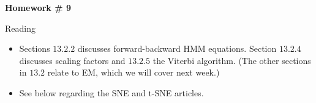 \documentclass{article}
\begin{document}
\renewcommand{\a}{\textbf{a}}
\renewcommand{\b}{\textbf{b}}
\renewcommand{\d}{\textbf{d}}
\newcommand{\e}{\textbf{e}}

\large

\begin{center}
\textbf{Homework \# 9} \\  
\end{center}



\medskip


\newcommand{\normal}{\mathcal{N}}

Reading
\begin{itemize}
\item Sections $13.2.2$ discusses forward-backward HMM equations.  Section $13.2.4$ discusses scaling factors and $13.2.5$ the Viterbi algorithm.  (The other sections in $13.2$ relate to EM, which we will cover next week.)
\item See below regarding the SNE and t-SNE articles.
\end{itemize}
\end{document}
